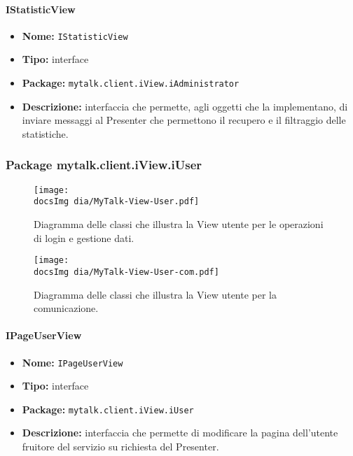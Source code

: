{{\paragraph{IStatisticView}{
	\begin{itemize}
		\item [] \textbf{Nome:} \texttt{IStatisticView}
		\item [] \textbf{Tipo:} interface
		\item [] \textbf{Package:} \texttt{mytalk.client.iView.iAdministrator}
		\item [] \textbf{Descrizione:}{ interfaccia che permette, agli oggetti che la implementano, di inviare messaggi al Presenter che permettono il recupero e il filtraggio delle statistiche.}
	\end{itemize}
}
}


\subsubsection{Package mytalk.client.iView.iUser}{

	\begin{figure}[h!tbp]
		\centering
		\texttt{[image: \\docsImg dia/MyTalk-View-User.pdf]}
		\caption{Diagramma delle classi che illustra la View utente per le operazioni di login e gestione dati.}
	\end{figure}
	\newpage
	\begin{figure}[h!tbp]
		\centering
		\texttt{[image: \\docsImg dia/MyTalk-View-User-com.pdf]}
		\caption{Diagramma delle classi che illustra la View utente per la comunicazione.}
	\end{figure}

\paragraph{IPageUserView}{
	\begin{itemize}
		\item [] \textbf{Nome:} \texttt{IPageUserView}
		\item [] \textbf{Tipo:} interface
		\item [] \textbf{Package:} \texttt{mytalk.client.iView.iUser}
		\item [] \textbf{Descrizione:}{ interfaccia che permette di modificare la pagina dell'utente fruitore del servizio su richiesta del Presenter.}
	\end{itemize}
}
}}
